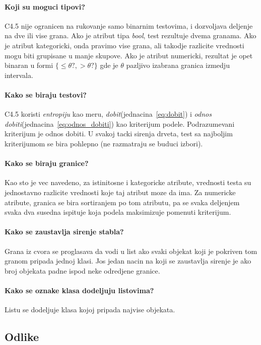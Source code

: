 \documentclass[a4paper]{article}
\begin{document}
\paragraph{Koji su moguci tipovi?} C4.5 nije ogranicen na rukovanje samo binarnim testovima, i
dozvoljava deljenje na dve ili vise grana. Ako je atribut tipa \emph{bool}, test rezultuje dvema
granama. Ako je atribut kategoricki, onda pravimo vise grana, ali takodje razlicite vrednosti mogu
biti grupisane u manje skupove. Ako je atribut numericki, rezultat je opet binaran u formi \(\{\leq
\theta?, > \theta?\}\) gde je \(\theta\) pazljivo izabrana granica izmedju intervala.

\paragraph{Kako se biraju testovi?} C4.5 koristi \emph{entropiju} kao meru,
\emph{dobit}(jednacina~\ref{eq:dobit}) i \emph{odnos dobiti}(jednacina~\ref{eq:odnos_dobiti}) kao
kriterijum podele. Podrazumevani kriterijum je odnos dobiti. U svakoj tacki sirenja drveta, test sa
najboljim kriterijumom se bira pohlepno (ne razmatraju se buduci izbori).

\paragraph{Kako se biraju granice?} Kao sto je vec navedeno, za istinitosne i kategoricke atribute,
vrednosti testa su jednostavno razlicite vrednosti koje taj atribut moze da ima. Za numericke
atribute, granica se bira sortiranjem po tom atributu, pa se svaka deljenjem svaka dva susedna
ispituje koja podela maksimizuje pomenuti kriterijum.

\paragraph{Kako se zaustavlja sirenje stabla?} Grana iz cvora se proglasava da vodi u list ako svaki
objekat koji je pokriven tom granom pripada jednoj klasi. Jos jedan nacin na koji se zaustavlja
sirenje je ako broj objekata padne ispod neke odredjene granice.

\paragraph{Kako se oznake klasa dodeljuju listovima?} Listu se dodeljuje klasa kojoj pripada najvise
objekata.

\subsection{Odlike}
\end{document}
